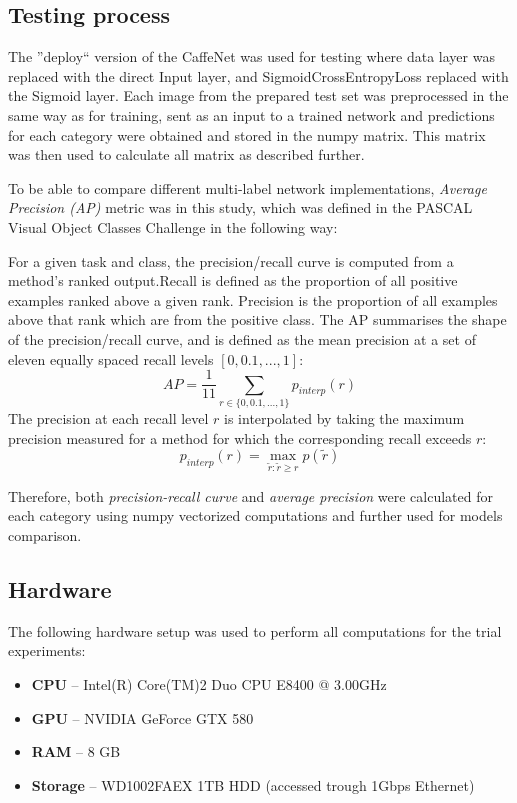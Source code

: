     \subsection{Testing process}
    \label{sec:trial-testing}
    The ''deploy`` version of the CaffeNet was used for testing where data layer was replaced with the direct Input layer, and SigmoidCrossEntropyLoss replaced with the Sigmoid layer. Each image from the prepared test set was preprocessed in the same way as for training, sent as an input to a trained network and predictions for each category were obtained and stored in the numpy matrix. This matrix was then used to calculate all matrix as described further.
    
    To be able to compare different multi-label network implementations, \textit{Average Precision (AP)} metric was in this study, which was defined in the PASCAL Visual Object Classes Challenge \cite{Everingham2010PASCAL-VOC} in the following way:
    
    \begin{displayquote}
    For a given task and class, the precision/recall curve is computed from a method’s ranked output.Recall is defined as the proportion of all positive examples ranked above a given rank. Precision is the proportion of all examples above that rank which are from the positive class. The AP summarises the shape of the precision/recall curve, and is defined as the mean precision at a set of eleven equally spaced recall levels $[0,0.1, . . . ,1]$:
    $$
    AP = \frac{1}{11} \sum_{r \in \{0, 0.1, ..., 1\}} p_{interp}(r)
    $$
    The precision at each recall level $r$ is interpolated by taking the maximum precision measured for a method for which the corresponding recall exceeds $r$:
    $$
    p_{interp}(r) = \max_{\tilde{r}:\tilde{r} \ge r} p(\tilde{r})
    $$
    \end{displayquote}
    
    Therefore, both \textit{precision-recall curve} and \textit{average precision} were calculated for each category using numpy vectorized computations and further used for models comparison.
    
    \subsection{Hardware}
    \label{sec:trial-hw}
    The following hardware setup was used to perform all computations for the trial experiments:
    \begin{itemize}
        \item \textbf{CPU} -- Intel(R) Core(TM)2 Duo CPU E8400 @ 3.00GHz
        \item \textbf{GPU} -- NVIDIA GeForce GTX 580
        \item \textbf{RAM} -- 8 GB
        \item \textbf{Storage} -- WD1002FAEX 1TB HDD (accessed trough 1Gbps Ethernet)
    \end{itemize}


